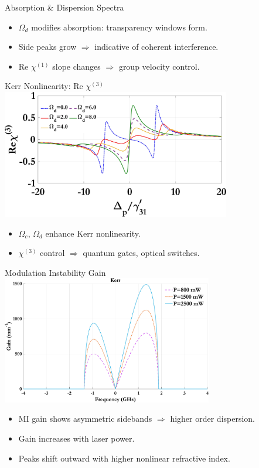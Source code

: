 \documentclass[12pt,aspectratio=1610]{beamer}
\begin{document}
\begin{frame}{Absorption \& Dispersion Spectra}
\begin{figure}[h]
\begin{minipage}{0.48\textwidth}
      \subcaption{}
    \end{minipage}\label{fig:chi1_d}
   \end{figure}
   \begin{itemize}
    \item $\Omega_d$ modifies absorption: transparency windows form.
    \item Side peaks grow $\Rightarrow$ indicative of coherent interference.
    \item Re $\chi^{(1)}$ slope changes $\Rightarrow$ group velocity control.
  \end{itemize}
\end{frame}

\begin{frame}{Kerr Nonlinearity: Re $\chi^{(3)}$}
  \vspace{-4pt}
  \hspace*{43pt}
  \includegraphics[width=0.75\textwidth]{Assets/Real_chi3_Omega_d.jpeg}
  \begin{itemize}
    \item $\Omega_c$, $\Omega_d$ enhance Kerr nonlinearity.
    \item $\chi^{(3)}$ control $\Rightarrow$ quantum gates, optical switches.
  \end{itemize}
\end{frame}

\begin{frame}{Modulation Instability Gain}
  \hspace*{45pt}
  \includegraphics[width=0.69\textwidth]{Assets/G_v_Power.jpeg}
  \begin{itemize}
    \item MI gain shows asymmetric sidebands $\Rightarrow$ higher order dispersion.
    \item Gain increases with laser power.
    \item Peaks shift outward with higher nonlinear refractive index.
  \end{itemize}
\end{frame}
\end{document}
